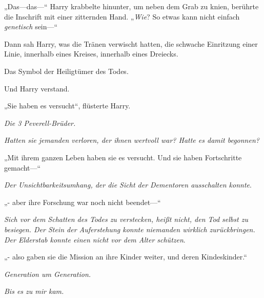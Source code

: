 „Das—das—“ Harry krabbelte hinunter, um neben dem Grab zu knien, berührte die Inschrift mit einer zitternden Hand. „\emph{Wie}? So etwas kann nicht einfach \emph{genetisch} sein—“

Dann sah Harry, was die Tränen verwischt hatten, die schwache Einritzung einer Linie, innerhalb eines Kreises, innerhalb eines Dreiecks.

Das Symbol der Heiligtümer des Todes.

Und Harry verstand.

„Sie haben es versucht“, flüsterte Harry.

\emph{Die 3 Peverell-Brüder.}

\emph{Hatten sie jemanden verloren, der ihnen wertvoll war? Hatte es damit begonnen?}

„Mit ihrem ganzen Leben haben sie es versucht. Und sie haben Fortschritte gemacht—“

\emph{Der Unsichtbarkeitsumhang, der die Sicht der Dementoren ausschalten konnte}.

 „- aber ihre Forschung war noch nicht beendet—“

\emph{Sich vor dem Schatten des Todes zu verstecken, heißt nicht, den Tod selbst zu besiegen. Der Stein der Auferstehung konnte niemanden wirklich zurückbringen. Der Elderstab konnte einen nicht vor dem Alter schützen}.

„- also gaben sie die Mission an ihre Kinder weiter, und deren Kindeskinder.“

\emph{Generation um Generation.}

\emph{Bis es zu mir kam.}

